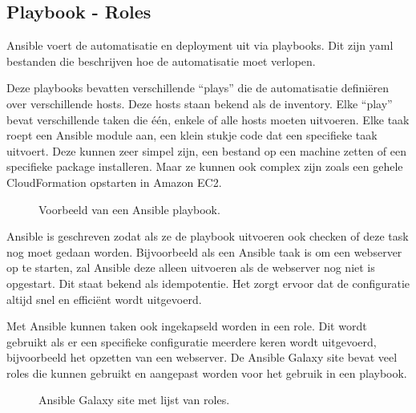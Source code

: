 \subsection{Playbook - Roles}
Ansible voert de automatisatie en deployment uit via playbooks. Dit zijn yaml bestanden die beschrijven hoe de automatisatie moet verlopen. 

Deze playbooks bevatten verschillende ``plays'' die de automatisatie definiëren over verschillende hosts. Deze hosts staan bekend als de inventory. Elke ``play'' bevat verschillende taken die één, enkele of alle hosts moeten uitvoeren. Elke taak roept een Ansible module aan, een klein stukje code dat een specifieke taak uitvoert. Deze kunnen zeer simpel zijn, een bestand op een machine zetten of een specifieke package installeren. Maar ze kunnen ook complex zijn zoals een gehele CloudFormation opstarten in Amazon EC2.
\begin{figure}[!htb]
	\caption{Voorbeeld van een Ansible playbook.}
	\label{fig:playbook}
\end{figure}

Ansible is geschreven zodat als ze de playbook uitvoeren ook checken of deze task nog moet gedaan worden. Bijvoorbeeld als een Ansible taak is om een webserver op te starten, zal Ansible deze alleen uitvoeren als de webserver nog niet is opgestart. Dit staat bekend als idempotentie. Het zorgt ervoor dat de configuratie altijd snel en efficiënt wordt uitgevoerd.

Met Ansible kunnen taken ook ingekapseld worden in een role. Dit wordt gebruikt als er een specifieke configuratie meerdere keren wordt uitgevoerd, bijvoorbeeld het opzetten van een webserver. De Ansible Galaxy site bevat veel roles die kunnen gebruikt en aangepast worden voor het gebruik in een playbook.
\begin{figure}[!htb]
	\caption{Ansible Galaxy site met lijst van roles.}
	\label{fig:agalaxy}
\end{figure}


